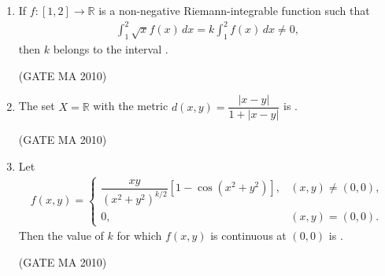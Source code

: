 \documentclass[journal,12pt,onecolumn]{IEEEtran}
\theoremstyle{remark}
\begin{document}
\begin{flushleft}
\begin{enumerate}
\item If $f:[1,2]\to \mathbb{R}$ is a non-negative Riemann-integrable function such that
\begin{align*}
\int_{1}^{2}\sqrt{x}f(x)\,dx = k \int_{1}^{2}f(x)\,dx \neq 0,
\end{align*}
then $k$ belongs to the interval \underline{\hspace{2cm}}.

\hfill (GATE MA 2010)

\begin{enumerate}
\begin{multicols}{4}
\item $\left[0,\dfrac{1}{\sqrt{2}}\right]$
\item $\left(\dfrac{1}{\sqrt{2}},\dfrac{2}{\sqrt{3}}\right]$
\item $\left(\dfrac{2}{\sqrt{3}},1\right]$
\item $\left(1,\dfrac{4}{3}\right]$
\end{multicols}
\end{enumerate}

\item The set $X=\mathbb{R}$ with the metric $d(x,y)=\dfrac{|x-y|}{1+|x-y|}$ is \underline{\hspace{2cm}}. 

\hfill(GATE MA 2010)

\begin{enumerate}
\end{enumerate}

\item Let 
\begin{align*}
f(x,y)=
\begin{cases}
\dfrac{xy}{(x^2+y^2)^{k/2}}\left[1-\cos(x^2+y^2)\right], & (x,y)\neq(0,0), \\[8pt]
0, & (x,y)=(0,0).
\end{cases}
\end{align*}
Then the value of $k$ for which $f(x,y)$ is continuous at $(0,0)$ is \underline{\hspace{2cm}}.

\hfill(GATE MA 2010)


\end{enumerate}
\end{flushleft}
\end{document}
